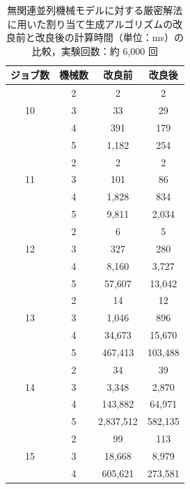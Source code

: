 \documentclass[12pt]{optlab-bachelor}
\begin{document}
\begin{table}[htb]
  \begin{center}
    \begin{tabular}{|c|c|c|c|} \hline
      ジョブ数 & 機械数 & 改良前 & 改良後 \\ \hline \hline
      & 2 & 2 & 2  \\ \cline{2-4}
      10 & 3 & 33 & 29  \\ \cline{2-4}
      & 4 & 391 & 179 \\ \cline{2-4}
      & 5 & 1,182 & 254  \\ \hline \hline
      & 2 & 2 & 2  \\ \cline{2-4}
      11 & 3 & 101 & 86 \\ \cline{2-4}
      & 4 & 1,828 & 834  \\ \cline{2-4}
      & 5 & 9,811 &  2,034 \\ \hline \hline
      & 2 & 6 & 5  \\ \cline{2-4}
      12 & 3 & 327 & 280  \\ \cline{2-4}
      & 4 & 8,160 & 3,727 \\ \cline{2-4}
      & 5 & 57,607 & 13,042 \\ \hline \hline
      & 2 & 14 & 12 \\ \cline{2-4}
      13 & 3 & 1,046 & 896 \\ \cline{2-4}
      & 4 & 34,673 & 15,670 \\ \cline{2-4}
      & 5 & 467,413 & 103,488 \\ \hline \hline
      & 2 & 34 & 39 \\ \cline{2-4}
      14 & 3 & 3,348 & 2,870 \\ \cline{2-4}
      & 4 & 143,882 & 64,971 \\ \cline{2-4}
      & 5 & 2,837,512 & 582,135 \\ \hline \hline
      & 2 & 99 & 113 \\ \cline{2-4}
      15 & 3 & 18,668 & 8,979 \\ \cline{2-4}
      & 4 & 605,621 & 273,581 \\ \hline \hline
    \end{tabular}
    \caption{無関連並列機械モデルに対する厳密解法に用いた割り当て生成アルゴリズムの改良前と改良後の計算時間（単位：ms）の比較，実験回数：約 6,000 回}
    \label{A3}
  \end{center}
\end{table}
\end{document}
